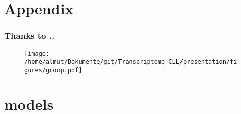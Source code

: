 \documentclass[xcolor=dvipsnames,t,10pt]{beamer}
\begin{document}
% 

\appendix
\section{Appendix}
%
%
%
\begin{frame}[c]
	\frametitle{Thanks to ..}
	\begin{figure}
		\centering
		\texttt{[image: /home/almut/Dokumente/git/Transcriptome\_CLL/presentation/figures/group.pdf]}
	\end{figure}
\end{frame}
%
\section{models}
%
%
%
\end{document}
